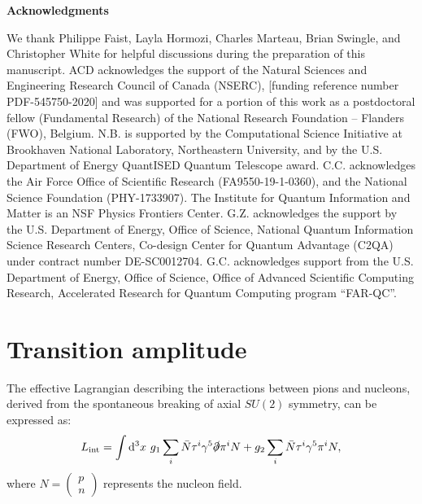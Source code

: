 \documentclass[11pt,english]{article}
\newcommand{\dee}{\mathrm{d}}
\begin{document}
\begin{center} 
{\bf Acknowledgments}
\end{center}
\noindent 
We thank Philippe Faist, Layla Hormozi, Charles Marteau, Brian Swingle, and Christopher White for helpful discussions during the preparation of this manuscript.
ACD acknowledges the support of the Natural Sciences and Engineering Research Council of Canada (NSERC), [funding reference number PDF-545750-2020] and was supported for a portion of this work as a postdoctoral fellow (Fundamental Research) of the National Research Foundation -- Flanders (FWO), Belgium.
N.B. is supported by the Computational Science Initiative at Brookhaven National Laboratory, Northeastern University, and by the U.S. Department of Energy QuantISED Quantum Telescope award. C.C. acknowledges  the Air Force Office of Scientific Research (FA9550-19-1-0360), and the National Science Foundation (PHY-1733907). The Institute for Quantum Information and Matter is an NSF Physics Frontiers Center. G.Z. acknowledges the support by the U.S. Department of Energy, Office of Science,
National Quantum Information Science Research Centers, Co-design Center for Quantum Advantage (C2QA)
under contract number DE-SC0012704.
G.C. acknowledges support from the U.S. Department of Energy, Office of Science, Office of Advanced Scientific Computing Research, Accelerated Research for
Quantum Computing program “FAR-QC”.








\appendix
\section{Transition amplitude}\label{pion}



The effective Lagrangian describing the interactions between pions and nucleons, derived from the spontaneous breaking of axial $SU(2)$ symmetry, can be expressed as:
\begin{equation}
L_{\text{int}} = \int \dee^3x ~ g_1\sum_i \bar{N}\tau^i\gamma^5\slashed{\partial}\pi^i N + g_2\sum_i \bar{N}\tau^i\gamma^5\pi^i N,
\end{equation}
where $N=\begin{pmatrix} p\\ n \end{pmatrix}$ represents the nucleon field.
\end{document}
